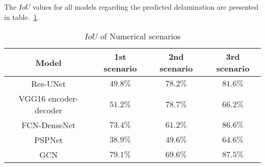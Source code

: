 The \(IoU\) values for all models regarding the predicted delamination are presented in table.~\ref{tab:table_numerical_scenarios}.
\begin{table}[]
	\centering
	\caption{\(IoU\) of Numerical scenarios}
	\label{tab:table_numerical_scenarios}
	\resizebox{\textwidth}{!}
	{
		\begin{tabular}{cccc}\hline
			Model & 1st scenario & 2nd scenario & 3rd scenario \\ \hline
			Res-UNet & \(49.8\%\) & \(78.2\%\) & \(81.6\%\)  \\ 
			VGG16 encoder-decoder & \(51.2\%\) & \(78.7\%\)  & \(66.2\%\)  \\
			FCN-DenseNet & \(73.4\%\)  & \(61.2\%\)  & \(86.6\%\)  \\ 
			PSPNet & \(38.9\%\) & \(49.6\%\) & \(64.6\%\)  \\ 
			GCN & \(79.1\%\) & \(69.6\%\) & \(87.5\%\) \\ \hline
		\end{tabular}
	}
\end{table}

